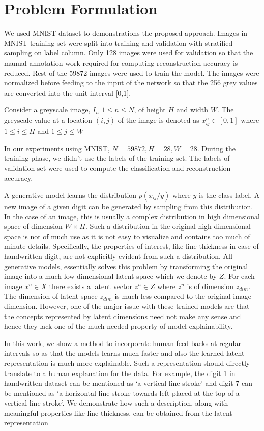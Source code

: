 \documentclass[journal]{IEEEtran}
\begin{document}
\section{Problem Formulation}
We used MNIST dataset to demonstrations the proposed approach. Images in MNIST training set were split into training and validation with stratified sampling on label column. Only 128 images were used for validation so that the manual annotation work required for computing reconstruction accuracy is reduced. Rest of the 59872 images were used to train the model. The images were normalized  before feeding to the input of the network so that the 256 grey values are converted into the unit interval [0,1].

Consider a greyscale image, $I_n$  $1\leq n \leq N$,  of height  $H$ and width $W$. The greyscale value at a location $(i, j)$ of the image is denoted  as $x_{ij}^{n} \in [0,1]$  where $1 \leq i \leq H$  and  $1\leq j \leq W$
 
 In our experiments using MNIST, $N= 59872, H=28,  W= 28$. During the training phase, we didn't use the labels of the training set. The labels of validation set were used to compute the classification and reconstruction accuracy. 
 
 A generative model learns the distribution $p(x_{ij}/y)$ where $y$ is the class label. A new image of a given digit can be generated by sampling from this distribution. In the case of an image, this is usually a complex distribution in high dimensional space of dimension $W \times H$. Such a distribution in the original high dimensional space is not of much use as it is not easy to visualize and contains too much of  minute details. Specifically, the properties of interest, like line thickness in case of handwritten digit, are not explicitly evident from such a distribution.   All generative models, essentially solves this problem by transforming the original image into a much low dimensional latent space which we denote by  $Z$. For each image $x^n \in X$ there exists a latent vector  $z^n \in Z$  where $z^n$ is of dimension $z_{dim}$. The dimension of latent space $z_{dim}$ is much less compared to the original image dimension. However, one of the major issue with these trained models are that the concepts represented by latent dimensions need not make any sense and hence they lack one of the much needed property of model explainability.
 
  In this work, we show a method to incorporate human feed backs at regular intervals so as that the models learns much faster and also the learned latent representation is much more explainable. Such a representation should directly translate to a human explanation for the data. For example, the digit 1 in  handwritten dataset  can be mentioned as  `a vertical line stroke'  and digit 7 can be mentioned as `a horizontal line stroke towards left placed at the top of a vertical line stroke'. We demonstrate how  such a description, along with meaningful properties like line thickness, can be obtained from the latent representation
 
\end{document}

